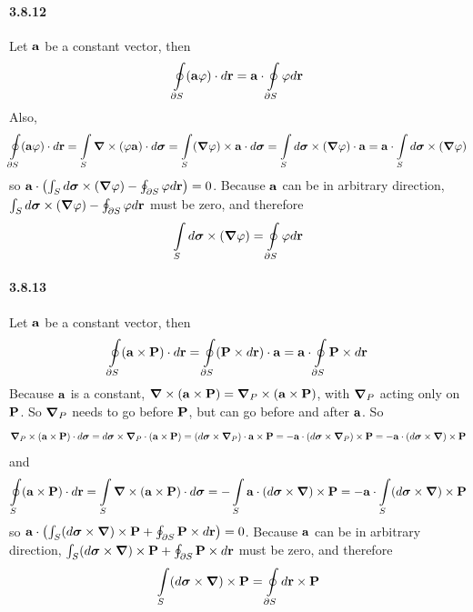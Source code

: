\documentclass[a4paper]{article}
\begin{document}
\paragraph{3.8.12}
Let $\mathbf{a}$ be a constant vector, then
\[
\oint\displaylimits_{\partial S}(\mathbf{a}\varphi)\cdot d\mathbf{r}=\mathbf{a}\cdot\oint\displaylimits_{\partial S}\varphi d\mathbf{r}
\]
Also, 
\[
\oint\displaylimits_{\partial S}(\mathbf{a}\varphi)\cdot d\mathbf{r}=\int\displaylimits_S\boldsymbol{\nabla}\times(\varphi\mathbf{a})\cdot d\boldsymbol{\sigma}=\int\displaylimits_S(\boldsymbol{\nabla}\varphi)\times\mathbf{a}\cdot d\boldsymbol{\sigma}=\int\displaylimits_S d\boldsymbol{\sigma}\times(\boldsymbol{\nabla}\varphi)\cdot\mathbf{a}=\mathbf{a}\cdot\int\displaylimits_S d\boldsymbol{\sigma}\times(\boldsymbol{\nabla}\varphi)
\]
so $\mathbf{a}\cdot\left(\int\displaylimits_S d\boldsymbol{\sigma}\times(\boldsymbol{\nabla}\varphi)-\oint\displaylimits_{\partial S}\varphi d\mathbf{r} \right)=0$.  Because $\mathbf{a}$ can be in arbitrary direction, $\int\displaylimits_S d\boldsymbol{\sigma}\times(\boldsymbol{\nabla}\varphi)-\oint\displaylimits_{\partial S}\varphi d\mathbf{r}$ must be zero, and therefore
\[
\int\displaylimits_S d\boldsymbol{\sigma}\times(\boldsymbol{\nabla}\varphi)= \oint\displaylimits_{\partial S}\varphi d\mathbf{r}
\]

\paragraph{3.8.13}
Let $\mathbf{a}$ be a constant vector, then
\[
\oint\displaylimits_{\partial S
}(\mathbf{a}\times\mathbf{P})\cdot d\mathbf{r}=\oint\displaylimits_{\partial S
}(\mathbf{P}\times d\mathbf{r})\cdot\mathbf{a}=\mathbf{a}\cdot\oint\displaylimits_{\partial S
}\mathbf{P}\times d\mathbf{r}
\]
Because $\mathbf{a}$ is a constant, $\boldsymbol{\nabla}\times(\mathbf{a}\times\mathbf{P})=\boldsymbol{\nabla}_P\times(\mathbf{a}\times\mathbf{P})$, with $\boldsymbol{\nabla}_P$ acting only on $\mathbf{P}$. So $\boldsymbol{\nabla}_P$ needs to go before $\mathbf{P}$, but can go before and after $\mathbf{a}$. So \[\boldsymbol{\nabla}_P\times(\mathbf{a}\times\mathbf{P})\cdot d\boldsymbol{\sigma}=d\boldsymbol{\sigma}\times\boldsymbol{\nabla}_P\cdot(\mathbf{a}\times\mathbf{P})=(d\boldsymbol{\sigma}\times\boldsymbol{\nabla}_P)\cdot\mathbf{a}\times\mathbf{P}=-\mathbf{a}\cdot(d\boldsymbol{\sigma}\times\boldsymbol{\nabla}_P)\times\mathbf{P}=-\mathbf{a}\cdot(d\boldsymbol{\sigma}\times\boldsymbol{\nabla})\times\mathbf{P}\]
and
\[
\oint\displaylimits_S(\mathbf{a}\times\mathbf{P})\cdot d\mathbf{r}=\int\displaylimits_S\boldsymbol{\nabla}\times(\mathbf{a}\times\mathbf{P})\cdot d\boldsymbol{\sigma}=-\int\displaylimits_S\mathbf{a}\cdot(d\boldsymbol{\sigma}\times\boldsymbol{\nabla})\times\mathbf{P}=-\mathbf{a}\cdot\int\displaylimits_S(d\boldsymbol{\sigma}\times\boldsymbol{\nabla})\times\mathbf{P}
\]
so $\mathbf{a}\cdot\left(\int\displaylimits_S(d\boldsymbol{\sigma}\times\boldsymbol{\nabla})\times\mathbf{P}+\oint\displaylimits_{\partial S
}\mathbf{P}\times d\mathbf{r} \right)=0$. Because $\mathbf{a}$ can be in arbitrary direction, $\int\displaylimits_S(d\boldsymbol{\sigma}\times\boldsymbol{\nabla})\times\mathbf{P}+\oint\displaylimits_{\partial S
}\mathbf{P}\times d\mathbf{r}$ must be zero, and therefore
\[
\int\displaylimits_S(d\boldsymbol{\sigma}\times\boldsymbol{\nabla})\times\mathbf{P}=\oint\displaylimits_{\partial S
}d\mathbf{r}\times\mathbf{P}
\]
\end{document}
